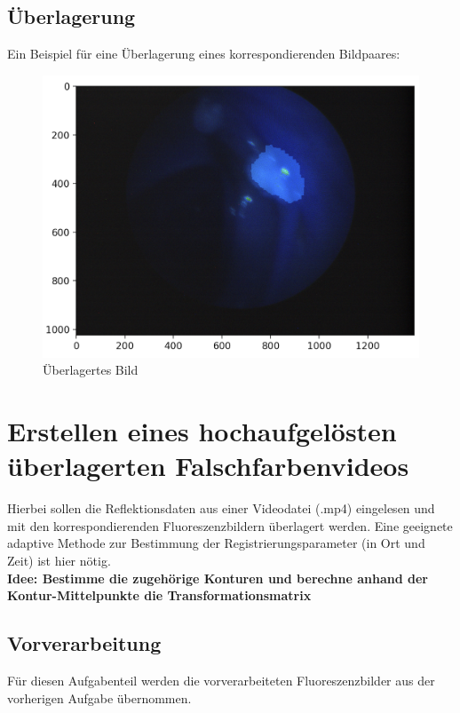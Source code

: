 \documentclass[conference]{IEEEtran}
\begin{document}
\subsection{Überlagerung}

Ein Beispiel für eine Überlagerung eines korrespondierenden Bildpaares:

\begin{figure}[h]
\includegraphics[scale=0.22]{Fig2}
\caption{Überlagertes Bild}
\end{figure}

\section{Erstellen eines hochaufgelösten überlagerten Falschfarbenvideos} 

Hierbei sollen die Reflektionsdaten aus einer Videodatei (.mp4) eingelesen und mit den korrespondierenden Fluoreszenzbildern überlagert werden. Eine geeignete adaptive Methode zur Bestimmung der Registrierungsparameter (in Ort und Zeit) ist hier nötig. \\

\textbf{Idee: Bestimme die zugehörige Konturen und berechne anhand der Kontur-Mittelpunkte die Transformationsmatrix} \\

\subsection{Vorverarbeitung}

Für diesen Aufgabenteil werden die vorverarbeiteten Fluoreszenzbilder aus der vorherigen Aufgabe übernommen. \\
\end{document}
